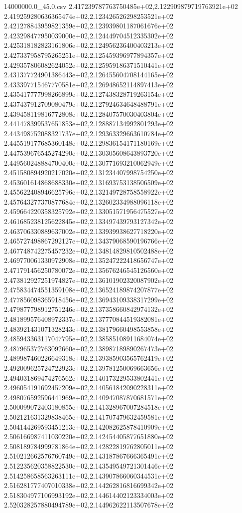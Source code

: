 \begin{filecontents*}{14000000.0_45.0.csv}
2.417239787763750485e+02,2.122909879719763921e+02
2.419259280636365474e+02,2.123426526298253521e+02
2.421278843959821359e+02,2.123939801187061676e+02
2.423298477950039000e+02,2.124449704512335302e+02
2.425318182823161806e+02,2.124956236400403213e+02
2.427337958795265251e+02,2.125459396977894357e+02
2.429357806082624052e+02,2.125959186371510441e+02
2.431377724901386443e+02,2.126455604708144165e+02
2.433397715467770581e+02,2.126948652114897413e+02
2.435417777998266899e+02,2.127438328719263154e+02
2.437437912709080479e+02,2.127924634648488791e+02
2.439458119816772808e+02,2.128407570030403804e+02
2.441478399537651853e+02,2.128887134992801293e+02
2.443498752088321737e+02,2.129363329663610784e+02
2.445519177685360148e+02,2.129836154171180169e+02
2.447539676545274290e+02,2.130305608643893720e+02
2.449560248884700400e+02,2.130771693210062949e+02
2.451580894920217020e+02,2.131234407998754250e+02
2.453601614868688330e+02,2.131693753138506509e+02
2.455622408946625796e+02,2.132149728758558922e+02
2.457643277370877684e+02,2.132602334988096118e+02
2.459664220358325792e+02,2.133051571956475527e+02
2.461685238125622845e+02,2.133497439793127342e+02
2.463706330889637002e+02,2.133939938627718220e+02
2.465727498867292127e+02,2.134379068590196766e+02
2.467748742275457232e+02,2.134814829810502488e+02
2.469770061330972908e+02,2.135247222418656747e+02
2.471791456250780072e+02,2.135676246545126560e+02
2.473812927251974827e+02,2.136101902320087902e+02
2.475834474551359108e+02,2.136524189874207877e+02
2.477856098365918456e+02,2.136943109338317299e+02
2.479877798912751246e+02,2.137358660842974132e+02
2.481899576408972337e+02,2.137770844519382081e+02
2.483921431071328243e+02,2.138179660498553858e+02
2.485943363117047795e+02,2.138585108911684074e+02
2.487965372763092660e+02,2.138987189890267473e+02
2.489987460226649318e+02,2.139385903565762419e+02
2.492009625724722923e+02,2.139781250069663656e+02
2.494031869474276562e+02,2.140173229533802441e+02
2.496054191692457209e+02,2.140561842090228311e+02
2.498076592596441969e+02,2.140947087870681571e+02
2.500099072403180855e+02,2.141328967007284518e+02
2.502121631329838465e+02,2.141707479632459581e+02
2.504144269593451213e+02,2.142082625878410909e+02
2.506166987411030220e+02,2.142454405877651880e+02
2.508189784999781864e+02,2.142822819762805011e+02
2.510212662576760749e+02,2.143187867666365491e+02
2.512235620358822530e+02,2.143549549721301446e+02
2.514258658563263111e+02,2.143907866060344531e+02
2.516281777407010338e+02,2.144262816816699342e+02
2.518304977106993192e+02,2.144614402123334003e+02
2.520328257880494789e+02,2.144962622113507678e+02

\end{filecontents*}
